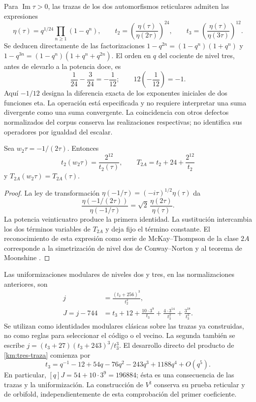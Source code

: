 Para \(\operatorname{Im}\tau>0\), las trazas de los dos automorfismos
reticulares admiten las expresiones
\begin{equation}
 \eta(\tau)=q^{1/24}\prod_{n\ge1}(1-q^n),\qquad
 t_2=\left(\frac{\eta(\tau)}{\eta(2\tau)}\right)^{24},\qquad
 t_3=\left(\frac{\eta(\tau)}{\eta(3\tau)}\right)^{12}.
 \label{km:eta-trazas}
\end{equation}
Se deducen directamente de las factorizaciones
\(1-q^{2n}=(1-q^n)(1+q^n)\) y
\(1-q^{3n}=(1-q^n)(1+q^n+q^{2n})\). El orden en \(q\) del
cociente de nivel tres, antes de elevarlo a la potencia doce, es
\[
 \frac1{24}-\frac3{24}=-\frac1{12};
 \qquad 12\left(-\frac1{12}\right)=-1.
\]
Aquí \(-1/12\) designa la diferencia exacta de los exponentes
iniciales de dos funciones eta. La operación está especificada y no
requiere interpretar una suma divergente como una suma convergente.
La coincidencia con otros defectos normalizados del corpus conserva
las realizaciones respectivas; no identifica sus operadores por
igualdad del escalar.

\begin{proposition}
\label{km:fricke-prop}
Sea \(w_2\tau=-1/(2\tau)\). Entonces
\begin{equation}
 t_2(w_2\tau)=\frac{2^{12}}{t_2(\tau)},\qquad
 T_{2A}=t_2+24+\frac{2^{12}}{t_2}
 \label{km:fricke-t2}
\end{equation}
y \(T_{2A}(w_2\tau)=T_{2A}(\tau)\).
\end{proposition}
\begin{proof}
La ley de transformación
\(\eta(-1/\tau)=(-i\tau)^{1/2}\eta(\tau)\) da
\[
 \frac{\eta(-1/(2\tau))}{\eta(-1/\tau)}
 =\sqrt2\,\frac{\eta(2\tau)}{\eta(\tau)}.
\]
La potencia veinticuatro produce la primera identidad. La sustitución
intercambia los dos términos variables de \(T_{2A}\) y deja fijo
el término constante. El reconocimiento de esta expresión como serie
de McKay--Thompson de la clase \(2A\) corresponde a la
simetrización de nivel dos de Conway--Norton
\cite[\S\S4 y 6, tabla~3]{kmconwaynorton1979} y al teorema
de Moonshine \cite{borcherds}.
\end{proof}

Las uniformizaciones modulares de niveles dos y tres, en las
normalizaciones anteriores, son
\begin{align}
 j&=\frac{(t_2+256)^3}{t_2^2},
 \label{km:j-nivel2}\\
 J=j-744
 &=t_3+12+\frac{10\cdot3^9}{t_3}
       +\frac{4\cdot3^{14}}{t_3^2}
       +\frac{3^{18}}{t_3^3}.
 \label{km:j-nivel3}
\end{align}
Se utilizan como identidades modulares clásicas sobre las trazas ya
construidas, no como reglas para seleccionar el código o el vecino.
La segunda también se escribe
\(j=(t_3+27)(t_3+243)^3/t_3^3\).
El desarrollo directo del producto de \eqref{km:tres-traza} comienza por
\[
 t_3=q^{-1}-12+54q-76q^2-243q^3+1188q^4+O(q^5).
\]
En particular, \([q]J=54+10\cdot3^9=196884\); ésta es una
consecuencia de las trazas y la uniformización. La construcción de
\(V^\natural\) conserva su prueba reticular y de orbifold,
independientemente de esta comprobación del primer coeficiente.

